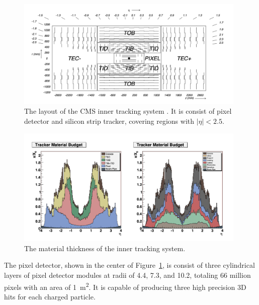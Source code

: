 \begin{figure}[ht]
    \centering
    \includegraphics[width=0.98\textwidth]{chapters/CMSExperiment/sectionDetector/figures/tracker.png}
    \caption{The layout of the CMS inner tracking system \cite{exhep:cms:Chatrchyan:2008aa}. It is consist of pixel detector and silicon strip tracker, covering regions with $|\eta|<2.5$. }
    \label{fig:cmsExperiment:detector:tracker}
\end{figure}


\begin{figure}[ht]
    \centering
    \includegraphics[width=0.98\textwidth]{chapters/CMSExperiment/sectionDetector/figures/trackerMaterial.png}
    \caption{The material thickness of the inner tracking system.}
    \label{fig:cmsExperiment:detector:trackerMaterial}
\end{figure}




The pixel detector, shown in the center of Figure~\ref{fig:cmsExperiment:detector:tracker}, is consist of three cylindrical layers of pixel detector modules at radii of 4.4, 7.3, and 10.2\cm, totaling 66 million pixels with an area of 1~\si{\m \squared}. It is capable of producing three high precision 3D hits for each charged particle. 

